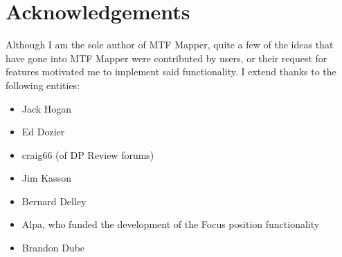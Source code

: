 \documentclass[a4paper]{article}
\begin{document}
\section{Acknowledgements}
Although I am the sole author of MTF Mapper, quite a few of the ideas that
have gone into MTF Mapper were contributed by users, or their request for
features motivated me to implement said functionality. I extend thanks to the following
entities:
\begin{itemize}
\item Jack Hogan
\item Ed Dozier
\item craig66 (of DP Review forums)
\item Jim Kasson
\item Bernard Delley
\item Alpa, who funded the development of the \textsf{Focus position}
functionality
\item Brandon Dube
\end{itemize}

\appendix
\end{document}

